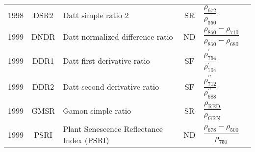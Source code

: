\documentclass[10pt]{article}
\begin{document}
\begin{ThreePartTable}
\begin{longtable}{c c m{2.3in} c M{2.8in} M{1.5in}}
  1998 & DSR2    & Datt simple ratio 2                                                            & SR & $\dfrac{\rho_{672}}{\rho_{550}}$                                                                                                                                                                                                                                                        & \citet{Datt1998}                                    \\
  1999 & DNDR    & Datt normalized difference ratio                                               & ND & $\dfrac{\rho_{850}-\rho_{710}}{\rho_{850}-\rho_{680}}$                                                                                                                                                                                                                                  & \citet{Datt1999a,Datt1999b}                         \\
  1999 & DDR1    & Datt first derivative ratio                                                    & SF & $\dfrac{\rho^\prime_{754}}{\rho^\prime_{704}}$                                                                                                                                                                                                                                          & \citet{Datt1999b}                                   \\
  1999 & DDR2    & Datt second derivative ratio                                                   & SF & $\dfrac{\rho^{\prime\prime}_{712}}{\rho^{\prime\prime}_{688}}$                                                                                                                                                                                                                          & \citet{Datt1999b}                                   \\
  1999 & GMSR    & Gamon simple ratio                                                             & SR & $\dfrac{\rho_\text{RED}}{\rho_\text{GRN}}$                                                                                                                                                                                                                                              & \citet{Gamon1999}                                   \\
  1999 & PSRI    & Plant Senescence Reflectance Index (PSRI)                                      & ND & $\dfrac{\rho_{678}-\rho_{500}}{\rho_{750}}$                                                                                                                                                                                                                                             & \citet{Merzlyak1999}                                \\

\end{longtable}
\end{ThreePartTable}
\end{document}
